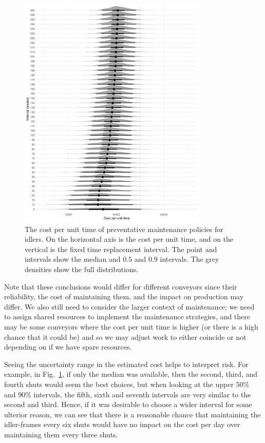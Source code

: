 \begin{figure}
  \centering
  \includegraphics[width=0.8\textwidth]{./figures/ch-3/cost-funciton.pdf}
  \caption{The cost per unit time of preventative maintenance policies for idlers. On the horizontal axis is the cost per unit time, and on the vertical is the fixed time replacement interval. The point and intervals show the median and $0.5$ and $0.9$ intervals. The grey densities show the full distributions.}
  \label{fig:preventative-repl-decision}
\end{figure}

Note that these conclusions would differ for different conveyors since their reliability, the cost of maintaining them, and the impact on production may differ. We also still need to consider the larger context of maintenance; we need to assign shared resources to implement the maintenance strategies, and there may be some conveyors where the cost per unit time is higher (or there is a high chance that it could be) and so we may adjust work to either coincide or not depending on if we have spare resources.

Seeing the uncertainty range in the estimated cost helps to interpret risk. For example, in Fig.~\ref{fig:preventative-repl-decision}, if only the median was available, then the second, third, and fourth shuts would seem the best choices, but when looking at the upper $50\%$ and $90\%$ intervals, the fifth, sixth and seventh intervals are very similar to the second and third. Hence, if it was desirable to choose a wider interval for some ulterior reason, we can see that there is a reasonable chance that maintaining the idler-frames every six shuts would have no impact on the cost per day over maintaining them every three shuts.

